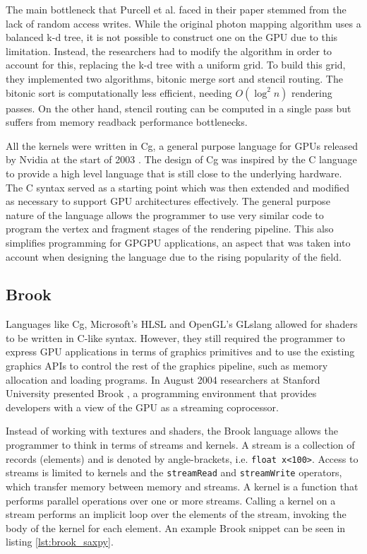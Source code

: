 The main bottleneck that Purcell et al. faced in their paper stemmed from the lack of random access writes. While the original photon mapping algorithm uses a balanced k-d tree, it is not possible to construct one on the GPU due to this limitation. Instead, the researchers had to modify the algorithm in order to account for this, replacing the k-d tree with a uniform grid. To build this grid, they implemented two algorithms, bitonic merge sort and stencil routing. The bitonic sort is computationally less efficient, needing \(O(\log^2 n)\) rendering passes. On the other hand, stencil routing can be computed in a single pass but suffers from memory readback performance bottlenecks.

All the kernels were written in Cg, a general purpose language for GPUs released by Nvidia at the start of 2003 \cite{nvidia_cg}. The design of Cg was inspired by the C language to provide a high level language that is still close to the underlying hardware. The C syntax served as a starting point which was then extended and modified as necessary to support GPU architectures effectively. The general purpose nature of the language allows the programmer to use very similar code to program the vertex and fragment stages of the rendering pipeline. This also simplifies programming for GPGPU applications, an aspect that was taken into account when designing the language due to the rising popularity of the field.

\subsection{Brook}
Languages like Cg, Microsoft's HLSL and OpenGL's GLslang allowed for shaders to be written in C-like syntax. However, they still required the programmer to express GPU applications in terms of graphics primitives and to use the existing graphics APIs to control the rest of the graphics pipeline, such as memory allocation and loading programs. In August 2004 researchers at Stanford University presented Brook \cite{brook}, a programming environment that provides developers with a view of the GPU as a streaming coprocessor.

Instead of working with textures and shaders, the Brook language allows the programmer to think in terms of streams and kernels. A stream is a collection of records (elements) and is denoted by angle-brackets, i.e. \texttt{float x<100>}. Access to streams is limited to kernels and the \texttt{streamRead} and \texttt{streamWrite} operators, which transfer memory between memory and streams. A kernel is a function that performs parallel operations over one or more streams. Calling a kernel on a stream performs an implicit loop over the elements of the stream, invoking the body of the kernel for each element. An example Brook snippet can be seen in listing \ref{lst:brook_saxpy}.


